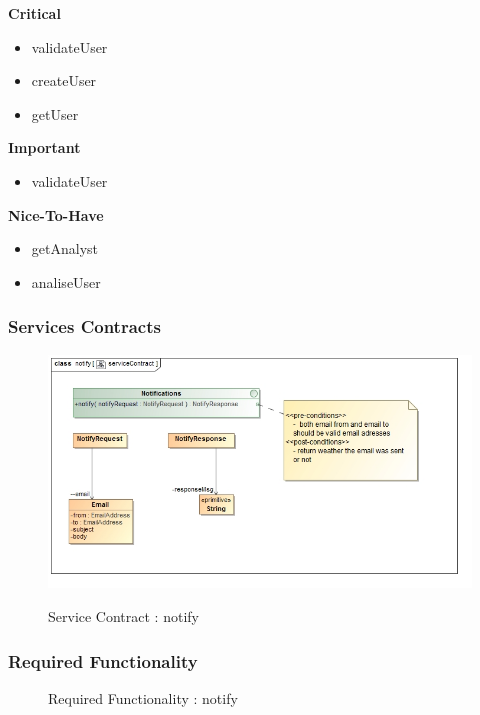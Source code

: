 \documentclass{article}
\begin{document}
		\begin{flushleft}
			\textbf{Critical}
				\begin{itemize}
					\item validateUser
					\item createUser
					\item getUser
				\end{itemize}
			\textbf{Important}
				\begin{itemize}
					\item validateUser
				\end{itemize}

			\textbf{Nice-To-Have}
				\begin{itemize}
					\item getAnalyst
					\item analiseUser
				\end{itemize}
		\end{flushleft}

		\subsubsection{Services Contracts}

		\begin{figure}[H]
		\includegraphics[width=\textwidth]{images/class__notify__serviceContract.jpg}  \\
		\caption{Service Contract : notify}
		\end{figure}

		\subsubsection{Required Functionality}

		\begin{figure}[H]
		\caption{Required Functionality : notify}
		\end{figure}
\end{document}
